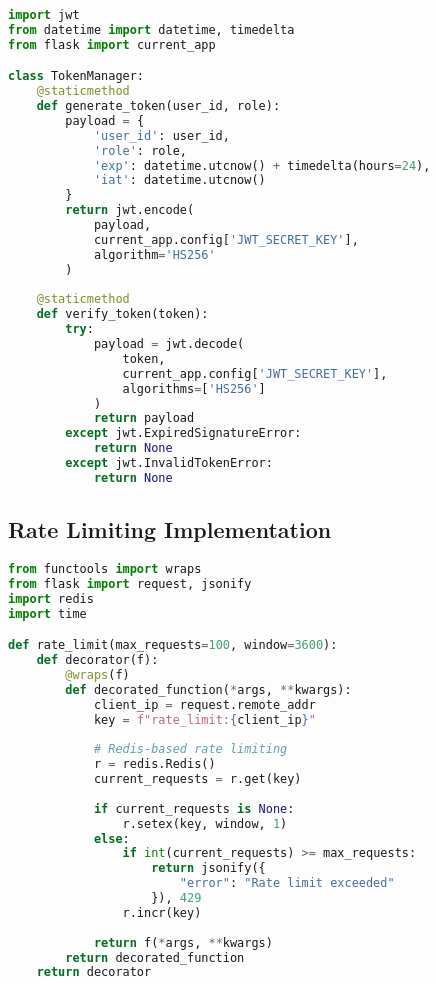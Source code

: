 \documentclass[12pt,a4paper]{report}
\begin{document}
\begin{lstlisting}[language=Python, caption=JWT Token Management]
import jwt
from datetime import datetime, timedelta
from flask import current_app

class TokenManager:
    @staticmethod
    def generate_token(user_id, role):
        payload = {
            'user_id': user_id,
            'role': role,
            'exp': datetime.utcnow() + timedelta(hours=24),
            'iat': datetime.utcnow()
        }
        return jwt.encode(
            payload, 
            current_app.config['JWT_SECRET_KEY'], 
            algorithm='HS256'
        )
    
    @staticmethod
    def verify_token(token):
        try:
            payload = jwt.decode(
                token, 
                current_app.config['JWT_SECRET_KEY'], 
                algorithms=['HS256']
            )
            return payload
        except jwt.ExpiredSignatureError:
            return None
        except jwt.InvalidTokenError:
            return None
\end{lstlisting}

\subsection{Rate Limiting Implementation}

\begin{lstlisting}[language=Python, caption=Rate Limiting Decorator]
from functools import wraps
from flask import request, jsonify
import redis
import time

def rate_limit(max_requests=100, window=3600):
    def decorator(f):
        @wraps(f)
        def decorated_function(*args, **kwargs):
            client_ip = request.remote_addr
            key = f"rate_limit:{client_ip}"
            
            # Redis-based rate limiting
            r = redis.Redis()
            current_requests = r.get(key)
            
            if current_requests is None:
                r.setex(key, window, 1)
            else:
                if int(current_requests) >= max_requests:
                    return jsonify({
                        "error": "Rate limit exceeded"
                    }), 429
                r.incr(key)
            
            return f(*args, **kwargs)
        return decorated_function
    return decorator
\end{lstlisting}
\end{document}
